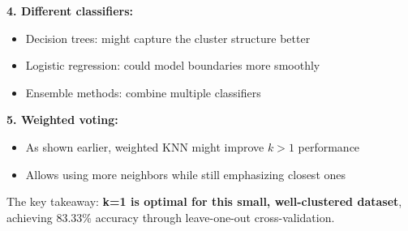 \documentclass[12pt]{article}
\begin{document}
\begin{explanation}
\textbf{4. Different classifiers:}
\begin{itemize}
    \item Decision trees: might capture the cluster structure better
    \item Logistic regression: could model boundaries more smoothly
    \item Ensemble methods: combine multiple classifiers
\end{itemize}

\textbf{5. Weighted voting:}
\begin{itemize}
    \item As shown earlier, weighted KNN might improve \(k>1\) performance
    \item Allows using more neighbors while still emphasizing closest ones
\end{itemize}

The key takeaway: \textbf{k=1 is optimal for this small, well-clustered dataset}, achieving 83.33\% accuracy through leave-one-out cross-validation.
\end{explanation}
\end{document}
